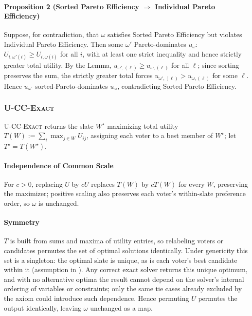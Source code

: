 \documentclass[letterpaper]{article} %
\newcommand{\Exact}{\textsc{U-CC-Exact}}
\begin{document}
\paragraph{Proposition 2 (Sorted Pareto Efficiency $\Rightarrow$ Individual Pareto Efficiency)} Suppose, for contradiction, that $\omega$ satisfies Sorted Pareto Efficiency but violates Individual Pareto Efficiency.
Then some $\omega'$ Pareto-dominates $u_\omega$: $U_{i,\omega'(i)}\ge U_{i,\omega(i)}$ for all $i$, with at least one strict inequality and hence strictly greater total utility.
By the Lemma, $u_{\omega',(\ell)}\ge u_{\omega,(\ell)}$ for all $\ell$; since sorting preserves the sum, the strictly greater total forces $u_{\omega',(\ell)}>u_{\omega,(\ell)}$ for some $\ell$.
Hence $u_{\omega'}$ sorted-Pareto-dominates $u_\omega$, contradicting Sorted Pareto Efficiency.

\subsubsection{\Exact{}} \label{app:exact-axiom-proofs}
\Exact{} returns the slate $W^\star$ maximizing total utility $T(W):=\sum_i\max_{j\in W}U_{ij}$, assigning each voter to a best member of $W^\star$; let $T^\star=T(W^\star)$.

\paragraph{Independence of Common Scale} For $c>0$, replacing $U$ by $cU$ replaces $T(W)$ by $cT(W)$ for every $W$, preserving the maximizer; positive scaling also preserves each voter's within-slate preference order, so $\omega$ is unchanged.

\paragraph{Symmetry} $T$ is built from sums and maxima of utility entries, so relabeling voters or candidates permutes the set of optimal solutions identically.
Under genericity this set is a singleton: the optimal slate is unique, as is each voter's best candidate within it (assumption in ).
Any correct exact solver returns this unique optimum, and with no alternative optima the result cannot depend on the solver's internal ordering of variables or constraints; only the same tie cases already excluded by the axiom could introduce such dependence.
Hence permuting $U$ permutes the output identically, leaving $\omega$ unchanged as a map.
\end{document}
